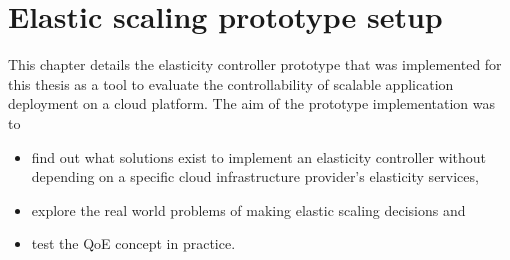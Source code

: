 \documentclass[english]{tktltiki2}
\theoremstyle{definition}
\theoremstyle{remark}
\begin{document}









%
%
%
%
%

\section{Elastic scaling prototype setup}
\label{sec:elasticScalingPrototypeSetup}

This chapter details the elasticity controller prototype that was implemented
for this thesis as a tool to evaluate the controllability of scalable
application deployment on a cloud platform. The aim of the prototype
implementation was to

\begin{itemize}
	\item{find out what solutions exist to implement an elasticity controller
	 without depending on a specific cloud infrastructure provider's elasticity 
	 services,}
	\item{explore the real world problems of making elastic scaling decisions and}
	\item{test the QoE concept in practice.}
\end{itemize}
\end{document}
